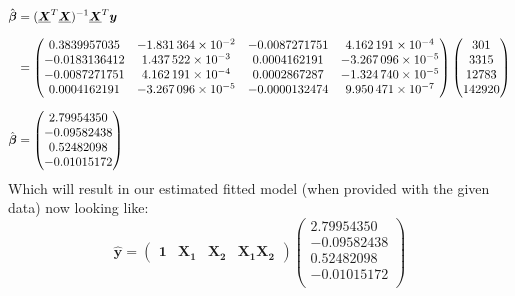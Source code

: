 \documentclass[12pt]{article}
\newcommand{\vect}[1]{\boldsymbol{#1}}
\newcommand{\mat}[1]{\underline{\boldsymbol{#1}}}
\newcommand{\trans}[1]{#1^T}
\newcommand{\est}[1]{\hat{#1}}
\begin{document}
\begin{equation*}
  \setlength{\jot}{10pt}
  \begin{split}
    \est{\vect{\beta}} & = (\trans{\mat{X}}\mat{X})^{-1}\trans{\mat{X}}\vect{y} \\
                      & =
                         \begin{pmatrix}
                            0.3839957035    &   \num{-1.831364e-02}    &   -0.0087271751    &    \num{4.162191e-04 } \\
                           -0.0183136412    &   \num{1.437522e-03 }    &    0.0004162191    &    \num{-3.267096e-05} \\
                           -0.0087271751    &   \num{4.162191e-04 }    &    0.0002867287    &    \num{-1.324740e-05} \\
                            0.0004162191    &   \num{-3.267096e-05}    &   -0.0000132474    &    \num{9.950471e-07 }
                         \end{pmatrix}
                         \begin{pmatrix}
                           301     \\
                           3315    \\
                           12783   \\
                           142920  \\
                         \end{pmatrix} \\
    \est{\vect{\beta}} & =
                        \begin{pmatrix}
                           2.79954350 \\
                          -0.09582438 \\
                           0.52482098 \\
                          -0.01015172 \\
                        \end{pmatrix}
  \end{split}
\end{equation*}
Which will result in our estimated fitted model (when provided with the given data) now looking like:
\begin{equation*}
\est{\vect{y}} = \begin{pmatrix}
                    \vect{1} & \vect{X_1} & \vect{X_2} & \vect{X_1}\vect{X_2}
                 \end{pmatrix}
                 \begin{pmatrix}
                    2.79954350 \\
                   -0.09582438 \\
                    0.52482098 \\
                   -0.01015172 \\
                 \end{pmatrix}
\end{equation*}
\end{document}
